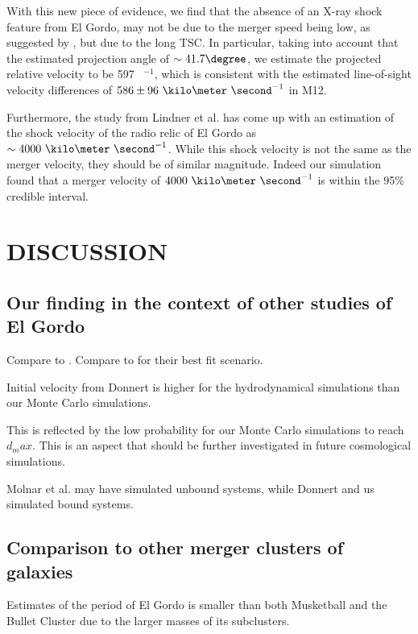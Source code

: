 With this new piece of evidence, we find that the absence of an
X-ray shock feature from El Gordo, may not be due to the merger speed being
low, as suggested by , but due to the long TSC. 
In particular, taking into account that the estimated projection angle of 
$\sim 41.7\degree$, we estimate the projected relative velocity to be 597 \kilo \meter~\second$^{-1}$, which is consistent with the estimated line-of-sight velocity differences of $586 \pm  96~\kilo \meter ~\second^{-1}$ in M12. 

Furthermore, the study from \cite{L13} Lindner et al. has come up
with an estimation of the shock velocity of the radio relic of El Gordo as 
$\sim 4000~\kilo \meter~\second^{-1}$. While this shock velocity is not the
same as the merger velocity, they should be of similar magnitude. Indeed
our simulation found that a merger velocity of $4000~\kilo
\meter~\second^{-1}$ is within the 95\% credible interval. 

\section{DISCUSSION}
\subsection{Our finding in the context of other studies of El Gordo}
%
Compare to \citet{L13}.
Compare to \citet{Donnert13} for their best fit scenario.

Initial velocity from Donnert is higher for the hydrodynamical simulations than our
Monte Carlo simulations.

This is reflected by the low probability for our Monte Carlo simulations
to reach $d_max$. This is an aspect that should be further investigated in
future cosmological simulations.


Molnar et al. may have simulated unbound systems, while Donnert and us
simulated bound systems. 


\subsection{Comparison to other merger clusters of galaxies}
%

Estimates of the period of El Gordo is smaller than both Musketball and
the Bullet Cluster due to the larger masses of its subclusters. 

